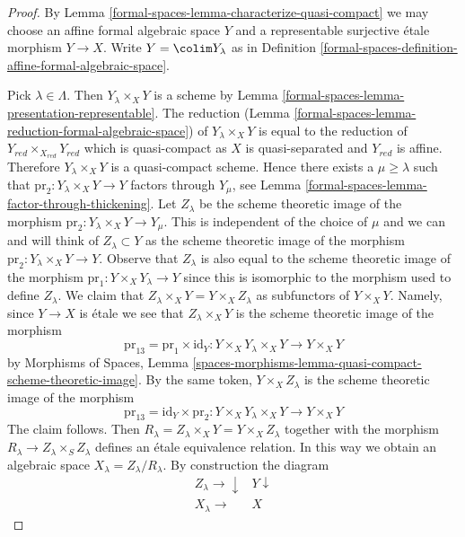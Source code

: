 \begin{proof}
By Lemma \ref{formal-spaces-lemma-characterize-quasi-compact} we may choose an
affine formal algebraic space $Y$ and a representable surjective
\'etale morphism $Y \to X$. Write $Y = \colim Y_\lambda$ as in
Definition \ref{formal-spaces-definition-affine-formal-algebraic-space}.

\medskip\noindent
Pick $\lambda \in \Lambda$. Then $Y_\lambda \times_X Y$ is a scheme by
Lemma \ref{formal-spaces-lemma-presentation-representable}. The reduction
(Lemma \ref{formal-spaces-lemma-reduction-formal-algebraic-space})
of $Y_\lambda \times_X Y$ is equal to the reduction of
$Y_{red} \times_{X_{red}} Y_{red}$ which is quasi-compact as $X$
is quasi-separated and $Y_{red}$ is affine.
Therefore $Y_\lambda \times_X Y$ is a quasi-compact scheme.
Hence there exists a $\mu \geq \lambda$ such that
$\text{pr}_2 : Y_\lambda \times_X Y \to Y$ factors
through $Y_\mu$, see Lemma \ref{formal-spaces-lemma-factor-through-thickening}.
Let $Z_\lambda$ be the scheme theoretic image of the morphism
$\text{pr}_2 : Y_\lambda \times_X Y \to Y_\mu$.
This is independent of the choice of $\mu$ and we can and
will think of $Z_\lambda \subset Y$ as the scheme theoretic
image of the morphism $\text{pr}_2 : Y_\lambda \times_X Y \to Y$.
Observe that $Z_\lambda$ is also equal to the scheme theoretic image
of the morphism $\text{pr}_1 : Y \times_X Y_\lambda \to Y$ since
this is isomorphic to the morphism used to define $Z_\lambda$.
We claim that $Z_\lambda \times_X Y = Y \times_X Z_\lambda$ as subfunctors
of $Y \times_X Y$. Namely, since $Y \to X$ is \'etale we see that
$Z_\lambda \times_X Y$ is the scheme theoretic image of the morphism
$$
\text{pr}_{13} = \text{pr}_1 \times \text{id}_Y :
Y \times_X Y_\lambda \times_X Y \longrightarrow Y \times_X Y
$$
by Morphisms of Spaces, Lemma
\ref{spaces-morphisms-lemma-quasi-compact-scheme-theoretic-image}.
By the same token, $Y \times_X Z_\lambda$ is the scheme theoretic image
of the morphism
$$
\text{pr}_{13} = \text{id}_Y \times \text{pr}_2 :
Y \times_X Y_\lambda \times_X Y \longrightarrow Y \times_X Y
$$
The claim follows. Then
$R_\lambda = Z_\lambda \times_X Y = Y \times_X Z_\lambda$
together with the morphism $R_\lambda \to Z_\lambda \times_S Z_\lambda$
defines an \'etale equivalence relation. In this way we obtain an algebraic
space $X_\lambda = Z_\lambda/R_\lambda$. By construction the diagram
$$
\begin{array}{cc}Z_\lambda \longrightarrow\downarrow & Y \downarrow \\ X_\lambda \longrightarrow & X\end{array}
$$
\end{proof}
